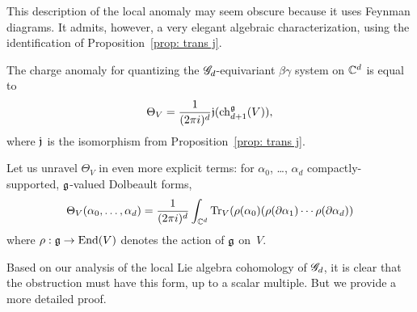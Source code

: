 
This description of the local anomaly may seem obscure because it uses Feynman diagrams.
It admits, however, a very elegant algebraic characterization, using the identification of Proposition~\ref{prop: trans j}. 

\begin{prop}\label{prop: bg anomaly}
The charge anomaly for quantizing the $\mathscr G_d$-equivariant $\beta\gamma$ system on $\mathbb C^d$ is equal to
\[
\Theta_V = \frac{1}{(2\pi i)^d} \mathfrak j ({\rm ch}_{d+1}^{\mathfrak g}(V)),
\]
where $\mathfrak j$ is the isomorphism from Proposition~\ref{prop: trans j}.
\end{prop}

Let us unravel $\Theta_V$ in even more explicit terms:
for $\alpha_0$, \dots, $\alpha_d$ compactly-supported, $\mathfrak g$-valued Dolbeault forms,
\[
\Theta_V(\alpha_0, \ldots, \alpha_d) = \frac{1}{(2\pi i)^d} \int_{\mathbb C^d} {\rm Tr}_V(\rho(\alpha_0) (\rho(\partial\alpha_1) \cdots \rho(\partial \alpha_d))
\]
where $\rho: \mathfrak g \to {\rm End}(V)$ denotes the action of $\mathfrak g$ on~$V$.

Based on our analysis of the local Lie algebra cohomology of $\mathscr G_d$, 
it is clear that the obstruction must have this form, up to a scalar multiple. 
But we provide a more detailed proof.

